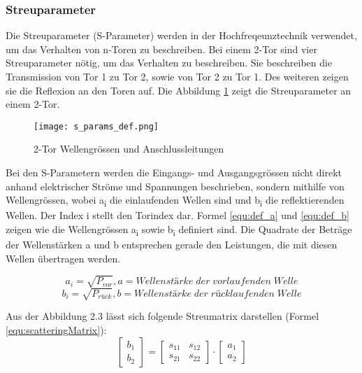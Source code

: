 \subsubsection{Streuparameter}\label{subsubsec:streuparameter}

Die Streuparameter (S-Parameter) werden in der Hochfreqeunztechnik verwendet, um das Verhalten von n-Toren zu beschreiben. Bei einem 2-Tor sind vier Streuparameter nötig, um das Verhalten zu beschreiben. Sie beschreiben die Transmission von Tor 1 zu Tor 2, sowie von Tor 2 zu Tor 1. Des weiteren zeigen sie die Reflexion an den Toren auf. Die Abbildung \ref{fig:2-Tor} zeigt die Streuparameter an einem 2-Tor. 

\begin{figure}[H]
	\centering
	\texttt{[image: s\_params\_def.png]}
	\caption{2-Tor Wellengrössen und Anschlussleitungen \cite{hftech}}
	\label{fig:2-Tor}
\end{figure}

Bei den S-Parametern werden die Eingangs- und Ausgangsgrössen nicht direkt anhand elektrischer Ströme und Spannungen beschrieben, sondern mithilfe von Wellengrössen, wobei a\textsubscript{i} die einlaufenden Wellen sind und b\textsubscript{i} die reflektierenden Wellen. Der Index i stellt den Torindex dar. Formel \ref{equ:def_a} und \ref{equ:def_b} zeigen wie die Wellengrössen a\textsubscript{i} sowie b\textsubscript{i} definiert sind. Die Quadrate der Beträge der Wellenstärken a und b entsprechen gerade den Leistungen, die mit diesen Wellen übertragen werden.\cite{hftech}\cite{Bernstein2015}

\begin{equation}\label{equ:def_a}
	a_{ i } = \sqrt{ P_{ vor } }, a = Wellenstärke\;der\;vorlaufenden\;Welle
\end{equation}
\begin{equation}\label{equ:def_b}
	b_{ i } = \sqrt{ P_{ rück } }, b = Wellenstärke\;der\;rücklaufenden\;Welle
\end{equation}

Aus der Abbildung 2.3 lässt sich folgende Streumatrix darstellen (Formel \ref{equ:scatteringMatrix}):
\begin{equation}\label{equ:scatteringMatrix}
	\left[
		\begin{matrix}b_1 \\ b_2 \end{matrix}
	\right]
 	=
 	\left[
 		\begin{matrix}
			s_{11}&s_{12} \\s_{21}&s_{22}
		\end{matrix}
	\right]
	\cdot 
	\left[
		\begin{matrix}
			a_1\\a_2
		\end{matrix}
	\right]
\end{equation}

